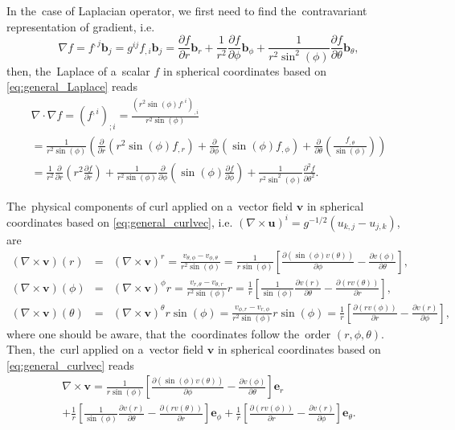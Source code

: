 \documentclass[review]{elsarticle}
\newcommand{\pdv}[2]{\frac{\partial{#1}}{\partial{#2}}}
\newcommand{\vect}[1]{\boldsymbol{#1}}
\begin{document}
In the~case of Laplacian operator, we first need to find the~contravariant 
representation of gradient, i.e.
\begin{equation}
  \nabla f = f^{,j}\vect{b}_j = g^{ij} f_{,i}\vect{b}_j 
  = \pdv{f}{r}\vect{b}_r + \frac{1}{r^2}\pdv{f}{\phi}\vect{b}_\phi
  + \frac{1}{r^2\sin^2(\phi)}\pdv{f}{\theta}\vect{b}_{\theta} ,
  \nonumber
\end{equation}
then, the~Laplace of a~scalar $f$ in spherical coordinates based on
\eqref{eq:general_Laplace} reads
\begin{multline}
  \nabla\cdot\nabla f = (f^{,i})_{;i} = 
  \frac{(r^2\sin(\phi)f^{,i})_{,i}}{r^2\sin(\phi)} \\
  = \frac{1}{r^2\sin(\phi)}\left( \pdv{}{r}\left(r^2\sin(\phi)f_{,r} \right) 
  + \pdv{}{\phi}\left(\sin(\phi) f_{,\phi} \right)
  + \pdv{}{\theta}\left(\frac{f_{,\theta}}{\sin(\phi)}\right) \right) \\
  = \frac{1}{r^2}\pdv{}{r}\left(r^2\pdv{f}{r} \right) 
  + \frac{1}{r^2\sin(\phi)} \pdv{}{\phi}\left(\sin(\phi) \pdv{f}{\phi}\right)
  + \frac{1}{r^2\sin^2(\phi)} \frac{\partial^2 f}{\partial\theta^2} .
  \label{eq:spher_Laplacef}
\end{multline}

The~physical components of curl applied on a~vector field $\vect{v}$ 
in spherical coordinates based on \eqref{eq:general_curlvec}, 
i.e. $(\nabla\times\vect{u})^i = g^{-1/2} (u_{k,j} - u_{j,k})$, are
\begin{eqnarray}
  (\nabla\times\vect{v})(r) &=& (\nabla\times\vect{v})^r 
  = \frac{v_{\theta,\phi} - v_{\phi,\theta}}{r^2\sin(\phi)} 
  = \frac{1}{r\sin(\phi)}
  \left[\pdv{(\sin(\phi)v(\theta))}{\phi} - \pdv{v(\phi)}{\theta} \right] , 
  \nonumber \\
  (\nabla\times\vect{v})(\phi) &=& (\nabla\times\vect{v})^\phi r 
  = \frac{v_{r,\theta} - v_{\theta,r}}{r^2\sin(\phi)} r  
  = \frac{1}{r}
  \left[\frac{1}{\sin(\phi)}\pdv{v(r)}{\theta} 
  - \pdv{(r v(\theta))}{r} \right] , 
  \nonumber \\
  (\nabla\times\vect{v})(\theta) &=& (\nabla\times\vect{v})^\theta r\sin(\phi) 
  = \frac{v_{\phi,r} - v_{r, \phi}}{r^2\sin(\phi)} r\sin(\phi) 
  = \frac{1}{r}
  \left[\pdv{(r v(\phi))}{r} 
  - \pdv{v(r)}{\phi} \right] , \nonumber
\end{eqnarray}
where one should be aware, that the~coordinates follow the~order 
$(r, \phi, \theta)$.
Then, the~curl applied on a~vector field $\vect{v}$ in spherical coordinates 
based on \eqref{eq:general_curlvec} reads
\begin{multline}
  \nabla\times\vect{v} = 
  \frac{1}{r\sin(\phi)}
  \left[\pdv{(\sin(\phi)v(\theta))}{\phi} - \pdv{v(\phi)}{\theta} \right] 
  \vect{e}_r\\
  + \frac{1}{r}
  \left[\frac{1}{\sin(\phi)}\pdv{v(r)}{\theta} 
  - \pdv{(r v(\theta))}{r} \right]
  \vect{e}_\phi
  + \frac{1}{r}
  \left[\pdv{(r v(\phi))}{r} 
  - \pdv{v(r)}{\phi} \right] 
  \vect{e}_\theta .
  \label{eq:spher_curlvec}
\end{multline}
\end{document}
